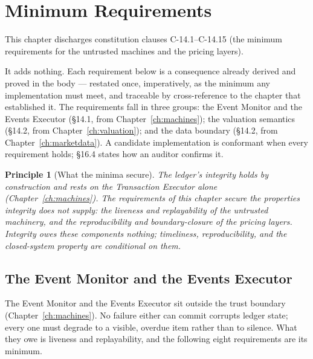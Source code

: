 \documentclass[11pt,a4paper]{article}
\newtheorem{principle}[definition]{Principle}
\begin{document}
\section{Minimum Requirements}\label{ch:requirements}

This chapter discharges constitution clauses C-14.1--C-14.15 (the minimum requirements for the untrusted machines and the pricing layers).

It adds nothing. Each requirement below is a consequence already derived and proved in
the body --- restated once, imperatively, as the minimum any implementation must meet, and
traceable by cross-reference to the chapter that established it. The requirements fall in
three groups: the Event Monitor and the Events Executor (\S 14.1, from
Chapter~\ref{ch:machines}); the valuation semantics (\S 14.2, from
Chapter~\ref{ch:valuation}); and the data boundary (\S 14.2, from
Chapter~\ref{ch:marketdata}). A candidate implementation is conformant when every
requirement holds; \S 16.4 states how an auditor confirms it.

\begin{principle}[What the minima secure]
The ledger's integrity holds by construction and rests on the Transaction Executor alone
(Chapter~\ref{ch:machines}). The requirements of this chapter secure the properties
integrity does \emph{not} supply: the liveness and replayability of the untrusted
machinery, and the reproducibility and boundary-closure of the pricing layers. Integrity
owes these components nothing; timeliness, reproducibility, and the closed-system property
are conditional on them.
\end{principle}

\subsection{The Event Monitor and the Events Executor}

The Event Monitor and the Events Executor sit outside the trust boundary
(Chapter~\ref{ch:machines}). No failure either can commit corrupts ledger state; every one
must degrade to a visible, overdue item rather than to silence. What they owe is liveness
and replayability, and the following eight requirements are its minimum.
\end{document}
